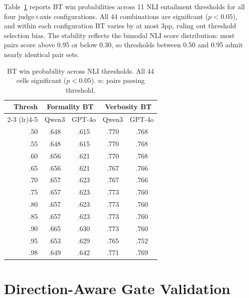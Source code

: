 Table~\ref{tab:nli_sweep} reports BT win probabilities across 11 NLI entailment thresholds for all four judge$\times$axis configurations.
All 44 combinations are significant ($p < 0.05$), and within each configuration BT varies by at most 3pp, ruling out threshold selection bias.
The stability reflects the bimodal NLI score distribution: most pairs score above 0.95 or below 0.30, so thresholds between 0.50 and 0.95 admit nearly identical pair sets.

\begin{table}[h]
\centering
\small
\caption{BT win probability across NLI thresholds. All 44 cells significant ($p < 0.05$). $n$: pairs passing threshold.}
\label{tab:nli_sweep}
\begin{tabular}{@{}rcccc@{}}
\toprule
Thresh & \multicolumn{2}{c}{Formality BT} & \multicolumn{2}{c}{Verbosity BT} \\
\cmidrule(lr){2-3} \cmidrule(lr){4-5}
 & Qwen3 & GPT-4o & Qwen3 & GPT-4o \\
\midrule
.50 & .648 & .615 & .770 & .768 \\
.55 & .648 & .615 & .770 & .768 \\
.60 & .656 & .621 & .770 & .768 \\
.65 & .656 & .621 & .767 & .766 \\
.70 & .657 & .623 & .767 & .766 \\
.75 & .657 & .623 & .773 & .760 \\
.80 & .657 & .623 & .773 & .760 \\
.85 & .657 & .623 & .773 & .760 \\
.90 & .665 & .630 & .773 & .760 \\
.95 & .653 & .629 & .765 & .752 \\
.98 & .649 & .642 & .771 & .769 \\
\bottomrule
\end{tabular}
\end{table}

\section{Direction-Aware Gate Validation}
\label{app:gate_validation}


